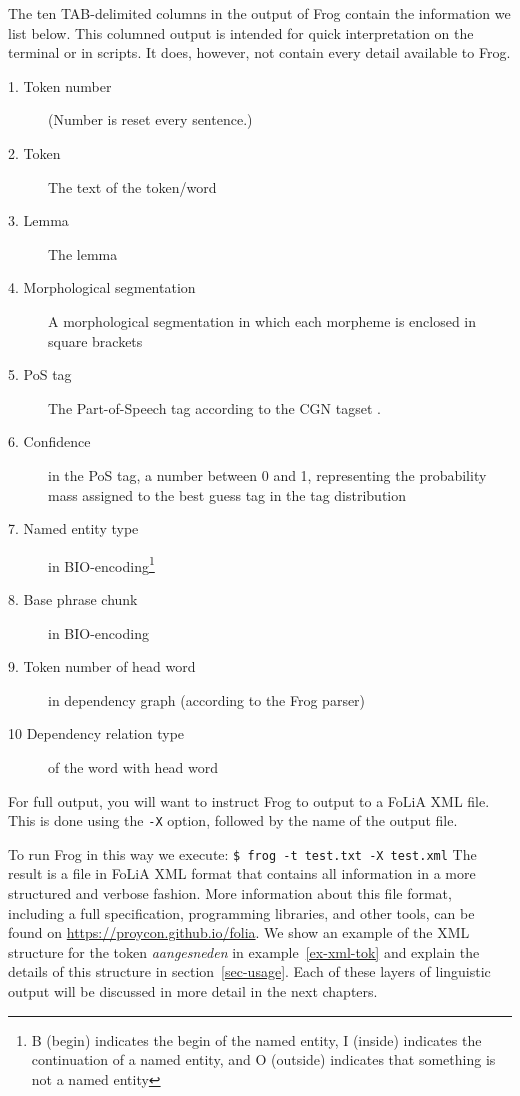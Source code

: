 \documentclass{book}
\begin{document}
The ten TAB-delimited columns in the output of Frog contain the
information we list below. This columned output is intended for quick interpretation on
the terminal or in scripts. It does, however, not contain every detail available to Frog.

\begin{description}
    \item[1. Token number] (Number is reset every sentence.)
    \item[2. Token] The text of the token/word
    \item[3. Lemma] The lemma
    \item[4. Morphological segmentation] A morphological segmentation in which each morpheme is enclosed in square brackets
    \item[5. PoS tag] The Part-of-Speech tag according to the CGN tagset \cite{vanEynde2004}.
    \item[6. Confidence] in the PoS tag, a number between 0 and 1, representing
        the probability mass assigned to the best guess tag in the tag
        distribution
    \item[7. Named entity type] in BIO-encoding\footnote{B (begin) indicates the
            begin of the named entity, I (inside) indicates the continuation of a named
        entity, and O (outside) indicates that something is not a named entity}
    \item[8. Base phrase chunk] in BIO-encoding
    \item[9. Token number of head word] in dependency graph (according to the Frog parser)
    \item[10 Dependency relation type] of the word with head word
\end{description}


For full output, you will want to instruct Frog to output to a FoLiA XML file.
This is done using the {\tt -X} option, followed by the name of the output
file.

To run Frog in this way we execute: {\tt \$ frog -t test.txt -X test.xml}
The result is a file in FoLiA XML format \cite{FOLIAPAPER} that contains all
information in a more structured and verbose fashion. More information about
this file format, including a full specification, programming libraries, and
other tools, can be found on \url{https://proycon.github.io/folia}. We show an
example of the XML structure for the token {\it aangesneden} in example~\ref{ex-xml-tok}
and explain the details of this structure in section~\ref{sec-usage}. Each of these layers of linguistic output will be discussed in more detail in the next chapters.
\end{document}
